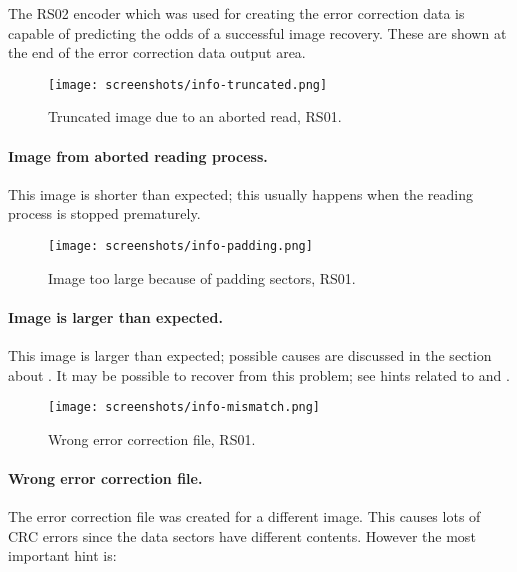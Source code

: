 \bigskip

The RS02 encoder which was used for creating the error correction data is
capable of predicting the odds of a successful image recovery. These are
shown at the end of the error correction data output area. 

\newpage

\begin{figure}[h]
\centerline{\texttt{[image: screenshots/info-truncated.png]}}
\caption{Truncated image due to an aborted read, RS01.}
\label{howto-info-truncated}
\end{figure}

\paragraph{\bf Image from aborted reading process.} This image is shorter
than expected; this usually happens when the reading process is stopped prematurely. 

\newpage

\begin{figure}[h]
\centerline{\texttt{[image: screenshots/info-padding.png]}}
\caption{Image too large because of padding sectors, RS01.}
\label{howto-info-padding}
\end{figure}

\paragraph{Image is larger than expected.} This image is larger than
expected; possible causes are discussed in the section
about . It may
be possible to recover from this problem; see hints
related to  and
. 

\newpage

\begin{figure}[h]
\centerline{\texttt{[image: screenshots/info-mismatch.png]}}
\caption{Wrong error correction file, RS01.}
\label{howto-info-mismatch}
\end{figure}


\paragraph{Wrong error correction file.} The error correction
file was created for a different image.
This causes lots of CRC errors since the data sectors have different
contents. However the most important hint is:

